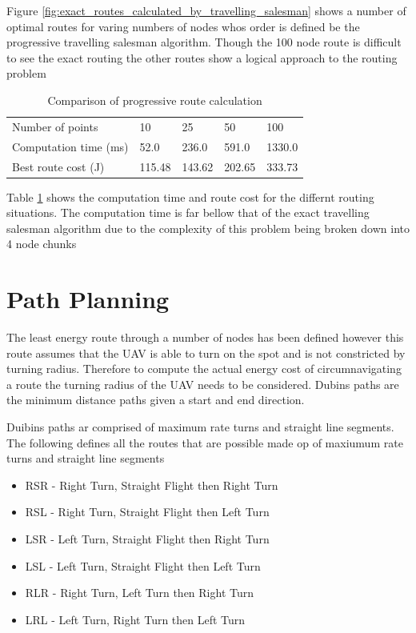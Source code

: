 \documentclass[a4paper,12pt,twoside]{article}
\begin{document}
Figure \ref{fig:exact_routes_calculated_by_travelling_salesman} shows a number of optimal routes for varing numbers of nodes whos order is defined be the progressive travelling salesman algorithm. Though the 100 node route is difficult to see the exact routing the other routes show a logical approach to the routing problem

\begin{table}[width=\textwidth]
\centering
    \begin{tabular}{lllll}
    Number of points	& 10	& 25	& 50	& 100	\\
Computation time (ms)	& 52.0	& 236.0	& 591.0	& 1330.0	\\
Best route cost (J)	& 115.48	& 143.62	& 202.65	& 333.73	\\

    \end{tabular}
\caption{Comparison of progressive route calculation}
\label{tbl:comparison_of_progressive_route_calculation}
\end{table}

Table \ref{tbl:comparison_of_progressive_route_calculation} shows the computation time and route cost for the differnt routing situations. The computation time is far bellow that of the exact travelling salesman algorithm due to the complexity of this problem being broken down into 4 node chunks

\section{Path Planning}
\label{sec:path_planning}

The least energy route through a number of nodes has been defined however this route assumes that the UAV is able to turn on the spot and is not constricted by turning radius. Therefore to compute the actual energy cost of circumnavigating a route the turning radius of the UAV needs to be considered. Dubins paths are the minimum distance paths given a start and end direction.

Duibins paths ar comprised of maximum rate turns and straight line segments. The following defines all the routes that are possible made op of maxiumum rate turns and straight line segments

\begin{itemize}
\item RSR - Right Turn, Straight Flight then Right Turn
\item RSL - Right Turn, Straight Flight then Left Turn
\item LSR - Left Turn, Straight Flight then Right Turn
\item LSL - Left Turn, Straight Flight then Left Turn
\item RLR - Right Turn, Left Turn then Right Turn
\item LRL - Left Turn, Right Turn then Left Turn

\end{itemize}
\end{document}
